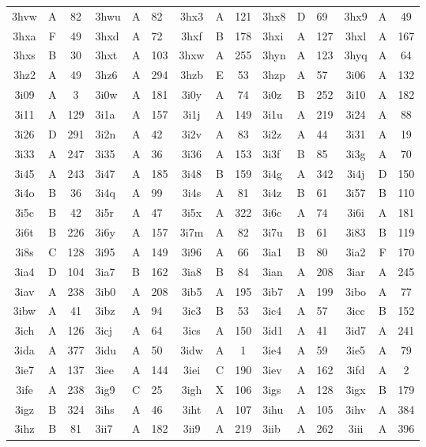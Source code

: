 \begin{longtable}{|c|c|c| a|a|a| c|c|c| a|a|a| c|c|c|}
3hvw & A & 82 & 3hwu & A & 82 & 3hx3 & A & 121 & 3hx8 & D & 69 & 3hx9 & A & 49\\
3hxa & F & 49 & 3hxd & A & 72 & 3hxf & B & 178 & 3hxi & A & 127 & 3hxl & A & 167\\
3hxs & B & 30 & 3hxt & A & 103 & 3hxw & A & 255 & 3hyn & A & 123 & 3hyq & A & 64\\
3hz2 & A & 49 & 3hz6 & A & 294 & 3hzb & E & 53 & 3hzp & A & 57 & 3i06 & A & 132\\
3i09 & A & 3 & 3i0w & A & 181 & 3i0y & A & 74 & 3i0z & B & 252 & 3i10 & A & 182\\
3i11 & A & 129 & 3i1a & A & 157 & 3i1j & A & 149 & 3i1u & A & 219 & 3i24 & A & 88\\
3i26 & D & 291 & 3i2n & A & 42 & 3i2v & A & 83 & 3i2z & A & 44 & 3i31 & A & 19\\
3i33 & A & 247 & 3i35 & A & 36 & 3i36 & A & 153 & 3i3f & B & 85 & 3i3g & A & 70\\
3i45 & A & 243 & 3i47 & A & 185 & 3i48 & B & 159 & 3i4g & A & 342 & 3i4j & D & 150\\
3i4o & B & 36 & 3i4q & A & 99 & 3i4s & A & 81 & 3i4z & B & 61 & 3i57 & B & 110\\
3i5c & B & 42 & 3i5r & A & 47 & 3i5x & A & 322 & 3i6c & A & 74 & 3i6i & A & 181\\
3i6t & B & 226 & 3i6y & A & 157 & 3i7m & A & 82 & 3i7u & B & 61 & 3i83 & B & 119\\
3i8s & C & 128 & 3i95 & A & 149 & 3i96 & A & 66 & 3ia1 & B & 80 & 3ia2 & F & 170\\
3ia4 & D & 104 & 3ia7 & B & 162 & 3ia8 & B & 84 & 3ian & A & 208 & 3iar & A & 245\\
3iav & A & 238 & 3ib0 & A & 208 & 3ib5 & A & 195 & 3ib7 & A & 199 & 3ibo & A & 77\\
3ibw & A & 41 & 3ibz & A & 94 & 3ic3 & B & 53 & 3ic4 & A & 57 & 3icc & B & 152\\
3ich & A & 126 & 3icj & A & 64 & 3ics & A & 150 & 3id1 & A & 41 & 3id7 & A & 241\\
3ida & A & 377 & 3idu & A & 50 & 3idw & A & 1 & 3ie4 & A & 59 & 3ie5 & A & 79\\
3ie7 & A & 137 & 3iee & A & 144 & 3iei & C & 190 & 3iev & A & 162 & 3ifd & A & 2\\
3ife & A & 238 & 3ig9 & C & 25 & 3igh & X & 106 & 3igs & A & 128 & 3igx & B & 179\\
3igz & B & 324 & 3ihs & A & 46 & 3iht & A & 107 & 3ihu & A & 105 & 3ihv & A & 384\\
3ihz & B & 81 & 3ii7 & A & 182 & 3ii9 & A & 219 & 3iib & A & 262 & 3iii & A & 396\\

\end{longtable}
